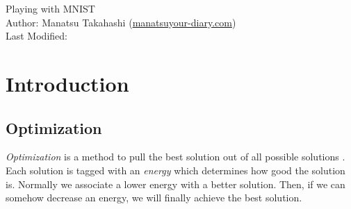 \documentclass{article}
\theoremstyle{definition}
\begin{document}
\begin{center}
{\Large Playing with MNIST}\\
\enter
Author: Manatsu Takahashi (\href{mailto:manatsu[AT][MARK]your-diary.com}{manatsuyour-diary.com})\\
Last Modified: \DTMnow
\end{center}

\enter
\begin{abstract}
In this tutorial paper, we learn what is and how to use Neural Network, which is an algorithm in the field of machine learning. We supply both theoretical explanations and a program which learns MNIST dataset to recognize hand-written digits. As for the program, it is written in C++ (not in common Python) without external library and the code structure is explained in detail. We also provide a simple GUI application in which a user draws a digit using his/her mouse and the true digit the user intended is inferred. It should be easy to apply neural networks to other problems after reading this paper. All the source codes are available in \href{https://github.com/your-diary/Playing-with-MNIST}{https://github.com/your-diary/Playing-with-MNIST} under MIT license.

\end{abstract}

\enter
\tableofcontents


\newpage
\section{Introduction}


\subsection{Optimization}

{\it Optimization} is a method to pull the best solution out of all possible solutions \cite{1}. Each solution is tagged with an {\it energy} which determines how good the solution is. Normally we associate a lower energy with a better solution. Then, if we can somehow decrease an energy, we will finally achieve the best solution.\\
\end{document}
